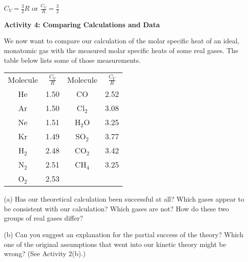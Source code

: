 {\centering \( C_{V}=\frac{3}{2}R \) or \( \frac{C_{V}}{R}=\frac{3}{2} \)\par}
\vspace{0.3in}

\textbf{Activity 4: Comparing Calculations and Data}

We now want to compare our calculation of the molar specific heat
of an ideal, monatomic gas with the measured molar specific heats
of some real gases. The table below lists some of those measurements.

{\renewcommand{\arraystretch}{1.2}
{\centering \begin{tabular}{|c|c|c|c|}
\hline 
Molecule&
\( \frac{C_{V}}{R} \)&
Molecule&
\( \frac{C_{V}}{R} \)\\
\hhline{|=|=|=|=|}
He&
1.50&
CO&
2.52\\
\hline 
Ar&
1.50&
Cl\( _{2} \)&
3.08\\
\hline 
Ne&
1.51&
H\( _{2} \)O&
3.25\\
\hline 
Kr&
1.49&
SO\( _{2} \)&
3.77\\
\hline 
H\( _{2} \)&
2.48&
CO\( _{2} \)&
3.42\\
\hline 
N\( _{2} \)&
2.51&
CH\( _{4} \)&
3.25\\
\hline 
O\( _{2} \)&
2.53&
&
\\
\hline
\end{tabular}\par}}
\vspace{0.3cm}

(a) Has our theoretical calculation been successful at all? Which
gases appear to be consistent with our calculation? Which gases are
not? How do these two groups of real gases differ?
\answerspace{1in}

(b) Can you suggest an explanation for the partial success of the
theory? Which one of the original assumptions that went into our kinetic
theory might be wrong? (See Activity 2(b).)
\answerspace{2in}

